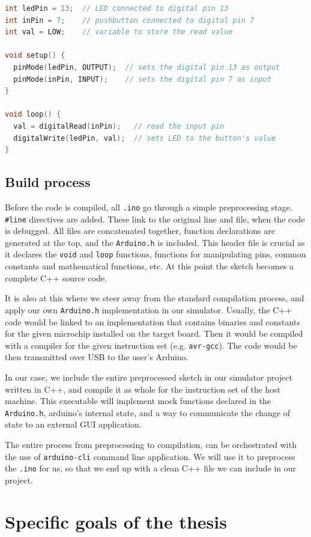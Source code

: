 \begin{lstlisting}[language=C, caption=Sketch example \cite{arduino_digital_read}]
int ledPin = 13;  // LED connected to digital pin 13
int inPin = 7;    // pushbutton connected to digital pin 7
int val = LOW;    // variable to store the read value

void setup() {
  pinMode(ledPin, OUTPUT);  // sets the digital pin 13 as output
  pinMode(inPin, INPUT);    // sets the digital pin 7 as input
}

void loop() {
  val = digitalRead(inPin);   // read the input pin
  digitalWrite(ledPin, val);  // sets LED to the button's value
}
\end{lstlisting}

\subsection{Build process}

Before the code is compiled, all \texttt{.ino} go through a simple preprocessing stage. \texttt{\#line} directives are added. These link to the original line and file, when the code is debugged. All files are concatenated together, function declarations are generated at the top, and the \texttt{Arduino.h} is included. This header file is crucial as it declares the \texttt{void} and \texttt{loop} functions, functions for manipulating pins, common constants and mathematical functions, etc. At this point the sketch becomes a complete C++ source code.

It is also at this where we steer away from the standard compilation process, and apply our own \texttt{Arduino.h} implementation in our simulator. Usually, the C++ code would be linked to an implementation that contains binaries and constants for the given microchip installed on the target board. Then it would be compiled with a compiler for the given instruction set (e.g. \texttt{avr-gcc}). The code would be then transmitted over USB to the user's Arduino.

In our case, we include the entire preprocessed sketch in our simulator project written in C++, and compile it as whole for the instruction set of the host machine. This executable will implement mock functions declared in the \texttt{Arduino.h}, arduino's internal state, and a way to communicate the change of state to an external GUI application.

The entire process from preprocessing to compilation, can be orchestrated with the use of \texttt{arduino-cli} command line application. We will use it to preprocess the \texttt{.ino} for us, so that we end up with a clean C++ file we can include in our project. 

\section{Specific goals of the thesis}

